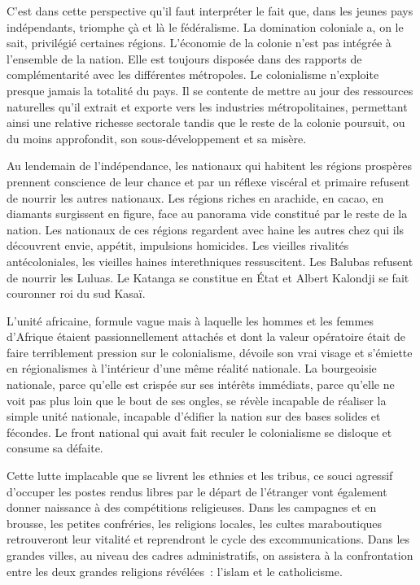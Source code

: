 \documentclass[french,twoside]{book} %
\begin{document}
C’est dans cette perspective qu’il faut interpréter le fait que, dans les jeunes pays indépendants, triomphe çà et là le fédéralisme. La domination coloniale a, on le sait, privilégié certaines régions. L’économie de la colonie n’est pas intégrée à l’ensemble de la nation. Elle est toujours disposée dans des rapports de complémentarité avec les différentes métropoles. Le colonialisme n’exploite presque jamais la totalité du pays. Il se contente de mettre au jour des ressources naturelles qu’il extrait et exporte vers les industries métropolitaines, permettant ainsi une relative richesse sectorale tandis que le reste de la colonie poursuit, ou du moins approfondit, son sous-développement et sa misère.\par
Au lendemain de l’indépendance, les nationaux qui habitent les régions prospères prennent conscience de leur chance et par un réflexe viscéral et primaire refusent de nourrir les autres nationaux. Les régions riches en arachide, en cacao, en diamants surgissent en figure, face au panorama vide constitué par le reste de la nation. Les nationaux de ces régions regardent avec haine les autres chez qui ils découvrent envie, appétit, impulsions homicides. Les vieilles rivalités antécoloniales, les vieilles haines interethniques ressuscitent. Les Balubas refusent de nourrir les Luluas. Le Katanga se constitue en État et Albert Kalondji se fait couronner roi du sud Kasaï.\par
\bigbreak
\noindent L’unité africaine, formule vague mais à laquelle les hommes et les femmes d’Afrique étaient passionnellement attachés et dont la valeur opératoire était de faire terriblement pression sur   le colonialisme, dévoile son vrai visage et s’émiette en régionalismes à l’intérieur d’une même réalité nationale. La bourgeoisie nationale, parce qu’elle est crispée sur ses intérêts immédiats, parce qu’elle ne voit pas plus loin que le bout de ses ongles, se révèle incapable de réaliser la simple unité nationale, incapable d’édifier la nation sur des bases solides et fécondes. Le front national qui avait fait reculer le colonialisme se disloque et consume sa défaite.\par
Cette lutte implacable que se livrent les ethnies et les tribus, ce souci agressif d’occuper les postes rendus libres par le départ de l’étranger vont également donner naissance à des compétitions religieuses. Dans les campagnes et en brousse, les petites confréries, les religions locales, les cultes maraboutiques retrouveront leur vitalité et reprendront le cycle des excommunications. Dans les grandes villes, au niveau des cadres administratifs, on assistera à la confrontation entre les deux grandes religions révélées : l’islam et le catholicisme.\par
\end{document}

